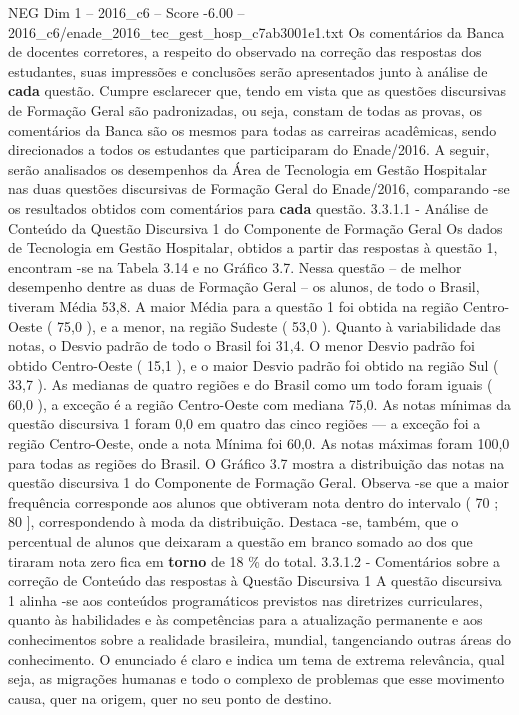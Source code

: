 \begin{textsample}{NEG Dim 1 – 2016\_c6 – Score -6.00 – 2016\_c6/enade\_2016\_tec\_gest\_hosp\_c7ab3001e1.txt}
Os comentários da Banca de docentes corretores, a respeito do observado na correção das respostas dos estudantes, suas impressões e conclusões serão apresentados junto à análise de \textbf{cada} questão.
Cumpre esclarecer que, tendo em vista que as questões discursivas de Formação Geral são padronizadas, ou seja, constam de todas as provas, os comentários da Banca são os mesmos para todas as carreiras acadêmicas, sendo direcionados a todos os estudantes que participaram do Enade/2016.
A seguir, serão analisados os desempenhos da Área de Tecnologia em Gestão Hospitalar nas duas questões discursivas de Formação Geral do Enade/2016, comparando -se os resultados obtidos com comentários para \textbf{cada} questão. 3.3.1.1 - Análise de Conteúdo da Questão Discursiva 1 do Componente de Formação Geral Os dados de Tecnologia em Gestão Hospitalar, obtidos a partir das respostas à questão 1, encontram -se na Tabela 3.14 e no Gráfico 3.7.
Nessa questão – de melhor desempenho dentre as duas de Formação Geral – os alunos, de todo o Brasil, tiveram Média 53,8.
A maior Média para a questão 1 foi obtida na região Centro-Oeste ( 75,0 ), e a menor, na região Sudeste ( 53,0 ).
Quanto à variabilidade das notas, o Desvio padrão de todo o Brasil foi 31,4.
O menor Desvio padrão foi obtido Centro-Oeste ( 15,1 ), e o maior Desvio padrão foi obtido na região Sul ( 33,7 ).
As medianas de quatro regiões e do Brasil como um todo foram iguais ( 60,0 ), a exceção é a região Centro-Oeste com mediana 75,0.
As notas mínimas da questão discursiva 1 foram 0,0 em quatro das cinco regiões — a exceção foi a região Centro-Oeste, onde a nota Mínima foi 60,0.
As notas máximas foram 100,0 para todas as regiões do Brasil.
O Gráfico 3.7 mostra a distribuição das notas na questão discursiva 1 do Componente de Formação Geral.
Observa -se que a maior frequência corresponde aos alunos que obtiveram nota dentro do intervalo ( 70 ; 80 ], correspondendo à moda da distribuição.
Destaca -se, também, que o percentual de alunos que deixaram a questão em branco somado ao dos que tiraram nota zero fica em \textbf{torno} de 18 \% do total. 3.3.1.2 - Comentários sobre a correção de Conteúdo das respostas à Questão Discursiva 1 A questão discursiva 1 alinha -se aos conteúdos programáticos previstos nas diretrizes curriculares, quanto às habilidades e às competências para a atualização permanente e aos conhecimentos sobre a realidade brasileira, mundial, tangenciando outras áreas do conhecimento.
O enunciado é claro e indica um tema de extrema relevância, qual seja, as migrações humanas e todo o complexo de problemas que esse movimento causa, quer na origem, quer no seu ponto de destino.

\end{textsample}
